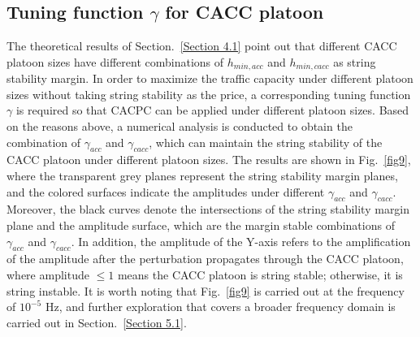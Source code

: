 \documentclass[journal]{IEEEtran}
\begin{document}
\subsection{Tuning function $\gamma$ for CACC platoon}
\label{Section 4.3}

The theoretical results of Section.~\ref{Section 4.1} point out that different CACC platoon sizes have different combinations of $h_{min,acc}$ and $h_{min,cacc}$ as string stability margin. In order to maximize the traffic capacity under different platoon sizes without taking string stability as the price, a corresponding tuning function $\gamma$ is required so that CACPC can be applied under different platoon sizes. Based on the reasons above, a numerical analysis is conducted to obtain the combination of $\gamma_{acc}$ and $\gamma_{cacc}$, which can maintain the string stability of the CACC platoon under different platoon sizes. The results are shown in Fig.~\ref{fig9}, where the transparent grey planes represent the string stability margin planes, and the colored surfaces indicate the amplitudes under different $\gamma_{acc}$ and $\gamma_{cacc}$. Moreover, the black curves denote the intersections of the string stability margin plane and the amplitude surface, which are the margin stable combinations of $\gamma_{acc}$ and $\gamma_{cacc}$. In addition, the amplitude of the Y-axis refers to the amplification of the amplitude after the perturbation propagates through the CACC platoon, where amplitude $\le 1$ means the CACC platoon is string stable; otherwise, it is string instable. It is worth noting that Fig.~\ref{fig9} is carried out at the frequency of $10^{-5}$ Hz, and further exploration that covers a broader frequency domain is carried out in Section.~\ref{Section 5.1}.
\end{document}
